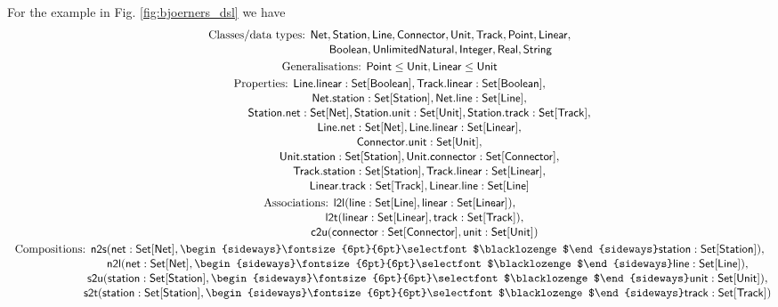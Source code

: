 \documentclass[10pt,fleqn,%
\ifpretendfinal
final%
\else
draft%
\fi,
]{scrreprt}
\newcommand{\composition}{\raisebox{0.2pt}{\begin{sideways}\fontsize{6pt}{6pt}\selectfont$\blacklozenge$\end{sideways}}}
\begin{document}
\medskip
For the example in Fig. \ref{fig:bjoerners_dsl} we have
%
\begin{gather*}
  \text{Classes/data types: }\mathsf{Net}, \mathsf{Station}, \mathsf{Line}, \mathsf{Connector}, \mathsf{Unit}, \mathsf{Track}, \mathsf{Point}, \mathsf{Linear},
\\[-.5ex]
  \phantom{\text{Classes/data types: }}\mathsf{Boolean}, \mathsf{UnlimitedNatural}, \mathsf{Integer}, \mathsf{Real}, \mathsf{String}
\\
  \text{Generalisations: }\mathsf{Point} \leq \mathsf{Unit}, \mathsf{Linear} \leq \mathsf{Unit}
\\
  \text{Properties: }\mathsf{Line.linear : Set[Boolean]}, \mathsf{Track.linear : Set[Boolean]},
\\[-.5ex]
  \phantom{\text{Properties: }}\mathsf{Net.station : Set[Station]}, \mathsf{Net.line : Set[Line]},
\\[-.5ex]
  \phantom{\text{Properties: }}\mathsf{Station.net : Set[Net]}, \mathsf{Station.unit : Set[Unit]}, \mathsf{Station.track : Set[Track]},
\\[-.5ex]
  \phantom{\text{Properties: }}\mathsf{Line.net : Set[Net]}, \mathsf{Line.linear : Set[Linear]},
\\[-.5ex]
  \phantom{\text{Properties: }}\mathsf{Connector.unit : Set[Unit]},
\\[-.5ex]
  \phantom{\text{Properties: }}\mathsf{Unit.station : Set[Station]}, \mathsf{Unit.connector : Set[Connector]},
\\[-.5ex]
  \phantom{\text{Properties: }}\mathsf{Track.station : Set[Station]}, \mathsf{Track.linear : Set[Linear]},
\\[-.5ex]
  \phantom{\text{Properties: }}\mathsf{Linear.track : Set[Track]}, \mathsf{Linear.line : Set[Line]}
\\
  \text{Associations: }\mathsf{l2l(line : Set[Line], linear : Set[Linear])},
\\[-.5ex]
  \phantom{\text{Associations: }}\mathsf{l2t(linear : Set[Linear], track : Set[Track])},
\\[-.5ex]
  \phantom{\text{Associations: }}\mathsf{c2u(connector : Set[Connector], unit : Set[Unit])}
\\
  \text{Compositions: }\mathsf{n2s(net : Set[Net], \composition station : Set[Station])},
\\[-.5ex]
  \phantom{\text{Compositions: }}\mathsf{n2l(net : Set[Net], \composition line : Set[Line])},
\\[-.5ex]
  \phantom{\text{Compositions: }}\mathsf{s2u(station : Set[Station], \composition unit : Set[Unit])},
\\[-.5ex]
  \phantom{\text{Compositions: }}\mathsf{s2t(station : Set[Station], \composition track : Set[Track])}
\end{gather*}
\end{document}
